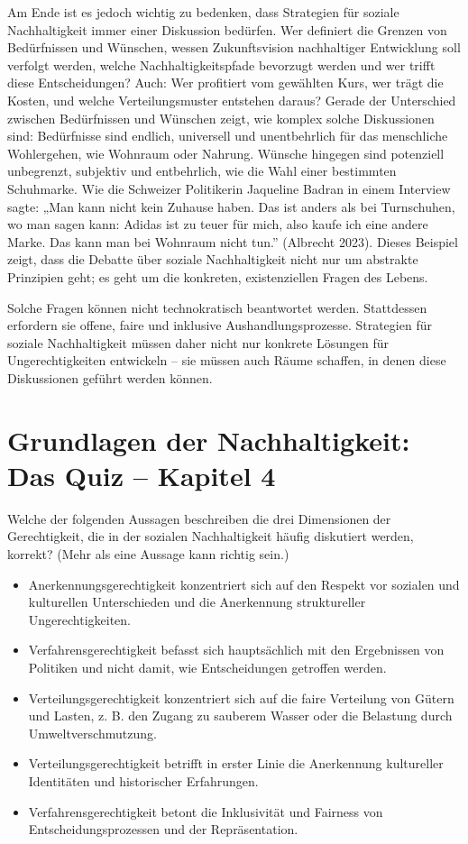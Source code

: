 \documentclass[
  nswissgerman,
  a4paper,
  DIV=11,
  numbers=noendperiod,
  oneside,
  openany]{scrreprt}
\providecommand{\tightlist}{%
  \setlength{\itemsep}{0pt}\setlength{\parskip}{0pt}}
\begin{document}
Am Ende ist es jedoch wichtig zu bedenken, dass Strategien für soziale
Nachhaltigkeit immer einer Diskussion bedürfen. Wer definiert die
Grenzen von Bedürfnissen und Wünschen, wessen Zukunftsvision
nachhaltiger Entwicklung soll verfolgt werden, welche
Nachhaltigkeitspfade bevorzugt werden und wer trifft diese
Entscheidungen? Auch: Wer profitiert vom gewählten Kurs, wer trägt die
Kosten, und welche Verteilungsmuster entstehen daraus? Gerade der
Unterschied zwischen Bedürfnissen und Wünschen zeigt, wie komplex solche
Diskussionen sind: Bedürfnisse sind endlich, universell und
unentbehrlich für das menschliche Wohlergehen, wie Wohnraum oder
Nahrung. Wünsche hingegen sind potenziell unbegrenzt, subjektiv und
entbehrlich, wie die Wahl einer bestimmten Schuhmarke. Wie die Schweizer
Politikerin Jaqueline Badran in einem Interview sagte: „Man kann nicht
kein Zuhause haben. Das ist anders als bei Turnschuhen, wo man sagen
kann: Adidas ist zu teuer für mich, also kaufe ich eine andere Marke.
Das kann man bei Wohnraum nicht tun.'' (Albrecht 2023). Dieses Beispiel
zeigt, dass die Debatte über soziale Nachhaltigkeit nicht nur um
abstrakte Prinzipien geht; es geht um die konkreten, existenziellen
Fragen des Lebens.

Solche Fragen können nicht technokratisch beantwortet werden.
Stattdessen erfordern sie offene, faire und inklusive
Aushandlungsprozesse. Strategien für soziale Nachhaltigkeit müssen daher
nicht nur konkrete Lösungen für Ungerechtigkeiten entwickeln -- sie
müssen auch Räume schaffen, in denen diese Diskussionen geführt werden
können.

\section{Grundlagen der Nachhaltigkeit: Das Quiz -- Kapitel
4}\label{grundlagen-der-nachhaltigkeit-das-quiz-kapitel-4}

Welche der folgenden Aussagen beschreiben die drei Dimensionen der
Gerechtigkeit, die in der sozialen Nachhaltigkeit häufig diskutiert
werden, korrekt? (Mehr als eine Aussage kann richtig sein.)

\begin{itemize}
\tightlist
\item[$\square$]
  Anerkennungsgerechtigkeit konzentriert sich auf den Respekt vor
  sozialen und kulturellen Unterschieden und die Anerkennung
  struktureller Ungerechtigkeiten.
\item[$\square$]
  Verfahrensgerechtigkeit befasst sich hauptsächlich mit den Ergebnissen
  von Politiken und nicht damit, wie Entscheidungen getroffen werden.
\item[$\square$]
  Verteilungsgerechtigkeit konzentriert sich auf die faire Verteilung
  von Gütern und Lasten, z. B. den Zugang zu sauberem Wasser oder die
  Belastung durch Umweltverschmutzung.
\item[$\square$]
  Verteilungsgerechtigkeit betrifft in erster Linie die Anerkennung
  kultureller Identitäten und historischer Erfahrungen.
\item[$\square$]
  Verfahrensgerechtigkeit betont die Inklusivität und Fairness von
  Entscheidungsprozessen und der Repräsentation.
\end{itemize}
\end{document}
